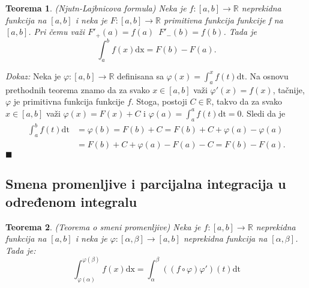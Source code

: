 \documentclass{article}
\newtheorem{teorema}{Teorema}[section]
\begin{document}
\begin{teoremabox}
    \label{teorema_2.9}
    \begin{teorema}
        (Njutn-Lajbnicova formula) Neka je $f:\left[a, b\right]\longrightarrow \mathbb{R}$ neprekidna funkcija na $\left[a,b\right]$ i neka je $F:\left[a, b\right]\longrightarrow\mathbb{R}$ primitivna funkcija funkcije f na $\left[a,b\right]$. Pri čemu važi $F'_+ \left(a\right) = f\left(a\right)\,\,\,F'_-\left(b\right) = f\left(b\right)$. Tada je
        $$ \int^b_a f\left(x\right)\text{dx} = F\left(b\right) - F\left(a\right).$$
    \end{teorema}
\end{teoremabox}

\textit{Dokaz:} Neka je $\varphi: \left[a, b\right] \longrightarrow \mathbb{R}$ definisana sa
$\varphi\left(x\right) = \displaystyle\int^x_a f\left(t\right)\text{dt}$. Na osnovu prethodnih teorema znamo da za svako $x\in \left[a, b\right]$ važi $\varphi'\left(x\right) = f\left(x\right)$,
tačnije, $\varphi$ je primitivna funkcija funkcije $f$. Stoga, postoji
$C \in \mathbb{R}$, takvo da za svako $x \in \left[a, b\right]$ važi
$\varphi\left(x\right) = F\left(x\right) + C$ i $\displaystyle\varphi\left(a\right)=\int_{a}^{a} f\left(t\right)\text{dt}=0$. Sledi da je
\begin{align*}
    \displaystyle\int^b_a f\left(t\right)\text{dt} & = \varphi\left(b\right) = F\left(b\right) + C = F\left(b\right) +C+ \varphi\left(a\right) - \varphi\left(a\right) \\
                                                   & = F\left(b\right) +C+ \varphi\left(a\right) - F\left(a\right)-C = F\left(b\right) - F\left(a\right).
\end{align*}
\null\hfill $\blacksquare$\par

\subsection{Smena promenljive i parcijalna integracija u određenom integralu}

\begin{teoremabox}
    \label{teorema_2.10}
    \begin{teorema}
        (Teorema o smeni promenljive) Neka je $f:\left[a, b\right]\longrightarrow \mathbb{R}$ neprekidna funkcija na $\left[a,b\right]$ i neka je $\varphi: \left[\alpha, \beta\right] \longrightarrow \left[a, b\right]$ neprekidna funkcija na $\left[\alpha, \beta\right]$. Tada je:
        $$\displaystyle \int^{\varphi\left(\beta\right)}_{\varphi\left(\alpha\right)} f\left(x\right)\text{dx} = \int^\beta_\alpha \left(\left(f\circ\varphi\right)\varphi'\right)\left(t\right)\text{dt}$$
    \end{teorema}
\end{teoremabox}
\end{document}
